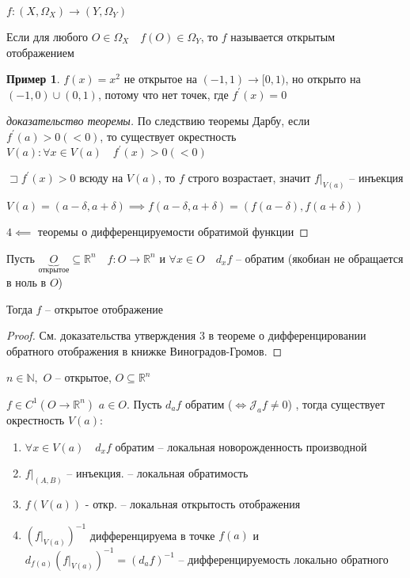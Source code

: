 \documentclass{book}
\newcommand\N{\ensuremath{\mathbb{N}}}
\newcommand\R{\ensuremath{\mathbb{R}}}
\newcommand{\p}[1]{#1^{\prime}}
\theoremstyle{definition}
\newtheorem*{example}{Пример}
\begin{document}
        \begin{definition}
            $f:\left( X, \Omega_X \right) \to \left( Y, \Omega_Y \right)  $

            Если для любого $O\in \Omega_X\quad f(O)\in \Omega_Y$, то  $f$ называется открытым отображением
        \end{definition}
        \begin{example}
            $f(x) = x^2$ не открытое на $(-1, 1) \to [0,1)$, но открыто на $(-1, 0) \cup (0, 1)$, потому что нет точек, где $\p f(x) = 0$
        \end{example}
        \begin{proof}
            [доказательство теоремы]
            По следствию теоремы Дарбу, если $\p f(a) >0 (<0)$, то существует окрестность  $V(a):\forall x\in V(a)\quad \p f(x) >0 (<0)$

            $\sqsupset \p f(x)>0$ всюду на  $V(a)$, то $f$ строго возрастает, значит  $f|_{V(a)}$ -- инъекция

            $V(a) = \left( a-\delta, a + \delta \right) \implies f\left( a-\delta, a+\delta \right) = \left( f(a-\delta), f(a+\delta) \right) $ 

            $4 \impliedby $ теоремы о дифференцируемости обратимой функции
        \end{proof}

        \begin{theorem}
            Пусть $\underbrace{O}_{\text{открытое}} \subseteq \R^n\quad f:O\to \R^n$ и $\forall x\in O\quad d_xf$ -- обратим (якобиан не обращается в ноль в  $O$)

            Тогда  $f$ -- открытое отображение


        \end{theorem}
        \begin{proof}
            См. доказательства утверждения 3 в теореме о дифференцировании обратного отображения в книжке Виноградов-Громов.
        \end{proof}
        \begin{theorem}

            $n\in \N, $ $O$ -- открытое,  $O\subseteq \R^n$

            $f\in C^1(O \to  \R^n)$ $a\in O$. Пусть  $d_af$ обратим ($\iff  \mathcal{J}_af\neq 0$) , тогда существует окрестность $V(a):$
            \begin{enumerate}
                \item $\forall x\in V(a)\quad d_xf$ обратим -- локальная новорожденность производной
                \item $f|_{(A, B)}$ -- инъекция. -- локальная обратимость
                \item  $f(V(a))$ - откр. -- локальная открытость отображения
                \item $\left( f|_{V(a)} \right)^{-1} $ дифференцируема в точке $f(a)$ и  $d_{f(a)} \left( f|_{V(a)} \right)^{-1}  = (d_{a}f)^{-1} $ -- дифференцируемость локально обратного
            \end{enumerate}
        \end{theorem}
\end{document}
